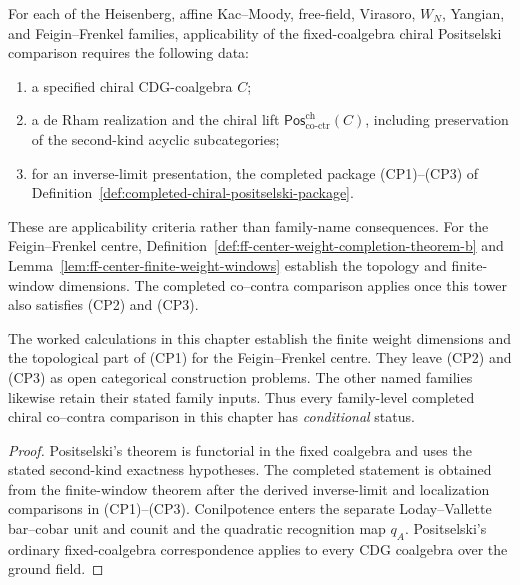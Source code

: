 \begin{corollary}
\label{cor:positselski-applicable-families}
For each of the Heisenberg, affine Kac--Moody, free-field, Virasoro,
\(W_N\), Yangian, and Feigin--Frenkel families, applicability of the
fixed-coalgebra chiral Positselski comparison requires the following
data:
\begin{enumerate}[label=\textup{(F\arabic*)}]
\item a specified chiral CDG-coalgebra \(C\);
\item a de Rham realization and the chiral lift
 \(\mathsf{Pos}^{\mathrm{ch}}_{\mathrm{co\text{-}ctr}}(C)\),
 including preservation of the second-kind acyclic subcategories;
\item for an inverse-limit presentation, the completed package
 \textup{(CP1)--(CP3)} of
 Definition~\ref{def:completed-chiral-positselski-package}.
\end{enumerate}
These are applicability criteria rather than family-name
consequences.  For the Feigin--Frenkel centre,
Definition~\ref{def:ff-center-weight-completion-theorem-b} and
Lemma~\ref{lem:ff-center-finite-weight-windows} establish the topology
and finite-window dimensions.  The completed co--contra comparison
applies once this tower also satisfies \textup{(CP2)} and
\textup{(CP3)}.

The worked calculations in this chapter establish the finite
weight dimensions and the topological part of \textup{(CP1)} for the
Feigin--Frenkel centre.  They leave \textup{(CP2)} and \textup{(CP3)}
as open categorical construction problems.  The other named families
likewise retain their stated family inputs.  Thus every family-level
completed chiral co--contra comparison in this chapter has
\emph{conditional} status.
\end{corollary}

\begin{proof}
Positselski's theorem is functorial in the fixed coalgebra and uses
the stated second-kind exactness hypotheses.  The completed statement
is obtained from the finite-window theorem after the derived
inverse-limit and localization comparisons in \textup{(CP1)--(CP3)}.
Conilpotence enters the separate Loday--Vallette bar--cobar unit and
counit and the quadratic recognition map \(q_A\).  Positselski's
ordinary fixed-coalgebra correspondence applies to every CDG
coalgebra over the ground field.
\end{proof}

